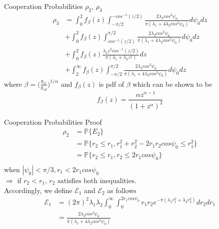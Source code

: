 \documentclass{beamer}
\begin{document}
\begin{frame}{Cooperation Probabilities} {$\rho_2$, $\rho_3$}
\begin{align*}
\rho_3 &= \int_0^2 f_{\beta}(z)\int_{-\pi/2}^{-cos^{-1}(z/2)}\frac{2\lambda_2 cos^2\psi_0}{\pi(\lambda_1+4\lambda_2cos^2\psi_0)}d\psi_0 dz \\ 
&+ \int_0^2 f_{\beta}(z)\int^{\pi/2}_{cos^{-1}(z/2)}\frac{2\lambda_2 cos^2\psi_0}{\pi(\lambda_1+4\lambda_2cos^2\psi_0)}d\psi_0 dz \\ &+\int_0^2 f_{\beta}(z)\frac{\lambda_2 z^2 cos^{-1}(z/2)}{\pi(\lambda_1+\lambda_2z^2)}dz \\ 
&+ \int_2^{\infty} f_{\beta}(z)\int_{-\pi/2}^{\pi/2}\frac{2\lambda_2 cos^2\psi_0}{\pi(\lambda_1+4\lambda_2cos^2\psi_0)}d\psi_0 dz
\end{align*}
where $\beta = \bigg(\frac{g_{sr}}{g_{sd}}\bigg)^{1/\alpha}$ and $f_{\beta}(z)$ is pdf of $\beta$ which can be shown to be 
\begin{equation*}
f_{\beta}(z) = \frac{\alpha z^{\alpha-1}}{(1+z^{\alpha})^2}
\end{equation*}
\end{frame}

\begin{frame}{Cooperation Probabilities} {Proof}
\begin{align*}
\rho_2 &= \mathbb{P}\{E_2\} \\
&= \mathbb{P}\{r_2 \leq r_1, r_1^2+r_2^2-2r_1r_2cos\psi_0 \leq r_1^2\} \\
&= \mathbb{P}\{r_2 \leq r_1, r_2 \leq 2 r_1 cos\psi_0 \} \\
\end{align*}
when $|\psi_0|<\pi/3, r_1 < 2r_1cos\psi_0$ \\ $ \Rightarrow$ if $ r_2 < r_1 
\text{, $r_2$ satisfies both inequalities.}$  \\
Accordingly, we define $\mathcal{E}_1$ and $\mathcal{E}_2$ as follows
\begin{align*}
\mathcal{E}_1 &= (2\pi)^2\lambda_1 \lambda_2 \int_0^\infty \int_0^{2r_1 cos\psi_0}r_1r_2e^{-\pi(\lambda_1 r_1^2 + \lambda_2 r_2^2)}dr_2 dr_1 \\
&= \frac{2\lambda_2 cos^2\psi_0}{\pi(\lambda_1+4\lambda_2cos^2\psi_0)} 
\end{align*}
\end{frame}
\end{document}

